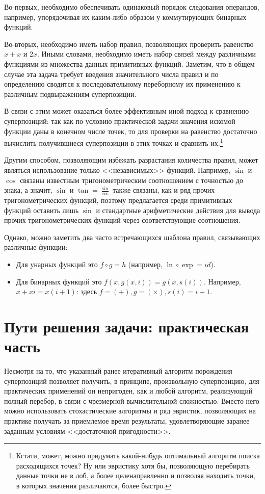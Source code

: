 \documentclass[12pt,a4paper]{amsart}
\begin{document}
Во-первых, необходимо обеспечивать одинаковый порядок следования операндов,
например, упорядочивая их каким-либо образом у коммутирующих бинарных функций.

Во-вторых, необходимо иметь набор правил, позволяющих проверить равенство
$x + x$ и $2x$. Иными словами, необходимо иметь набор связей между различными
функциями из множества данных примитивных функций. Заметим, что в общем
случае эта задача требует введения значительного числа правил и по определению
сводится к последовательному переборному их применению к различным
подвыражениям суперпозиции.

В связи с этим может оказаться более эффективным иной подход к сравнению
суперпозиций: так как по условию практической задачи значения искомой функции
даны в конечном числе точек, то для проверки на равенство достаточно вычислить
получившиеся суперпозиции в этих точках и сравнить их.\footnote{Кстати, может,
можно придумать какой-нибудь оптимальный алгоритм поиска расходящихся точек?
Ну или эвристику хотя бы, позволяющую перебирать данные точки не в лоб, а
более целенаправленно и позволяя находить точки, в которых значения различаются,
более быстро.}

Другим способом, позволяющим избежать разрастания количества правил, может
являться использование только <<независимых>> функций. Например, $\sin$ и
$\cos$ связаны известным тригонометрическим соотношением с точностью до знака,
а значит, $\sin$ и $\tan = \frac{\sin}{\cos}$ также связаны, как и ряд прочих
тригонометрических функций, поэтому предлагается среди примитивных функций
оставить лишь $\sin$ и стандартные арифметические действия для вывода прочих
тригонометрических функций через соответствующие соотношения.

Однако, можно заметить два часто встречающихся шаблона правил, связывающих
различные функции:
\begin{itemize}
  \item Для унарных функций это $f \circ g = h$ (например,
	$\ln \circ \exp = id$).
  \item Для бинарных функций это $ f (x, g (x, i)) = g (x, s (i)) $.
	Например, $x + xi = x(i+1)$: здесь $f = (+), g = (\times), s(i) = i + 1$.
\end{itemize}

\section{Пути решения задачи: практическая часть}

Несмотря на то, что указанный ранее итеративный алгоритм порождения
суперпозиций позволяет получить, в принципе, произвольную суперпозицию,
для практических применений он непригоден, как и любой алгоритм, реализующий
полный перебор, в связи с чрезмерной вычислительной сложностью. Вместо него
можно использовать стохастические алгоритмы и ряд эвристик, позволяющих на
практике получать за приемлемое время результаты, удовлетворяющие заранее
заданным условиям <<достаточной пригодности>>.
\end{document}

